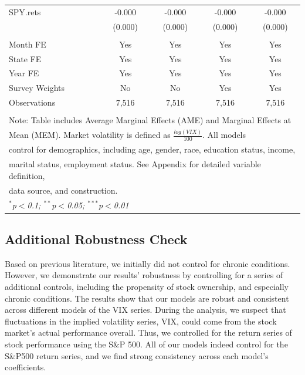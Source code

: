\documentclass[11pt,a4paper,oldfontcommands]{memoir}
\begin{document}
{\begin{footnotesize}
\begin{longtable}{l*{4}{c}}
SPY.rets            &      -0.000\sym{**} &      -0.000\sym{**} &      -0.000\sym{**} &      -0.000\sym{**} \\
                    &     (0.000)         &     (0.000)         &     (0.000)         &     (0.000)         \\
\hline \\[-1.8ex] 
Month FE  & Yes & Yes & Yes & Yes \\ 
State FE  & Yes & Yes & Yes & Yes \\ 
Year FE  & Yes & Yes & Yes & Yes \\
Survey Weights & No & No & Yes & Yes\\ 
Observations  & 7,516 & 7,516 & 7,516 & 7,516 \\ 
\hline \\[-1.8ex] 
\multicolumn{5}{l}{Note: Table includes Average Marginal Effects (AME) and Marginal Effects at}\\
\multicolumn{5}{l}{Mean (MEM). Market volatility is defined as $\frac{log(VIX)}{100}$. All models}\\
\multicolumn{5}{l}{control for demographics, including age, gender, race, education status, income,}\\
\multicolumn{5}{l}{marital status, employment status. See Appendix for detailed variable definition,}\\
\multicolumn{5}{l}{data  source, and construction.}\\
\multicolumn{5}{l}{ \textit{$^{*}$p$<$0.1; $^{**}$p$<$0.05; $^{***}$p$<$0.01}} \\ 
\hline\hline
\end{longtable}
\end{footnotesize}



\subsection{Additional Robustness Check}

Based on previous literature, we initially did not control for chronic conditions. However, we demonstrate our results' robustness by controlling for a series of additional controls, including the propensity of stock ownership, and especially chronic conditions. The results show that our models are robust and consistent across different models of the VIX series. During the analysis, we suspect that fluctuations in the implied volatility series, VIX, could come from the stock market's actual performance overall. Thus, we controlled for the return series of stock performance using the S&P 500. All of our models indeed control for the S&P500 return series, and we find strong consistency across each model's coefficients. 

}
\end{document}
